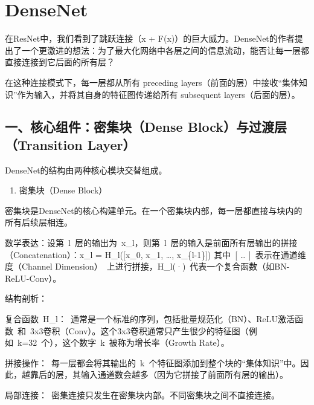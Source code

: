 \setcounter{section}{4}

\hypertarget{densenet}{%
\section{DenseNet}\label{densenet}}

在ResNet中，我们看到了跳跃连接（x + F(x)）的巨大威力。DenseNet的作者提出了一个更激进的想法：为了最大化网络中各层之间的信息流动，能否让每一层都直接连接到它后面的所有层？

在这种连接模式下，每一层都从所有 preceding layers（前面的层）中接收``集体知识''作为输入，并将其自身的特征图传递给所有 subsequent layers（后面的层）。

\hypertarget{ux4e00ux6838ux5fc3ux7ec4ux4ef6ux5bc6ux96c6ux5757dense-blockux4e0eux8fc7ux6e21ux5c42transition-layer}{%
\subsection{一、核心组件：密集块（Dense Block）与过渡层（Transition Layer）}\label{ux4e00ux6838ux5fc3ux7ec4ux4ef6ux5bc6ux96c6ux5757dense-blockux4e0eux8fc7ux6e21ux5c42transition-layer}}

DenseNet的结构由两种核心模块交替组成。

\begin{enumerate}
\def\labelenumi{\arabic{enumi}.}
\tightlist
\item
  密集块（Dense Block）
\end{enumerate}

密集块是DenseNet的核心构建单元。在一个密集块内部，每一层都直接与块内的所有后续层相连。

数学表达：设第~l~层的输出为~x\_l，则第~l~层的输入是前面所有层输出的拼接（Concatenation）：x\_l = H\_l({[}x\_0, x\_1, \ldots, x\_\{l-1\}{]})
其中~{[} \ldots{} {]}~表示在通道维度（Channel Dimension）~上进行拼接，H\_l(·)~代表一个复合函数（如BN-ReLU-Conv）。

结构剖析：

复合函数~H\_l：~通常是一个标准的序列，包括批量规范化（BN）、ReLU激活函数~和~3x3卷积（Conv）。这个3x3卷积通常只产生很少的特征图（例如~k=32~个），这个数字~k~被称为增长率（Growth Rate）。

拼接操作：~每一层都会将其输出的~k~个特征图添加到整个块的``集体知识''中。因此，越靠后的层，其输入通道数会越多（因为它拼接了前面所有层的输出）。

局部连接：~密集连接只发生在密集块内部。不同密集块之间不直接连接。

